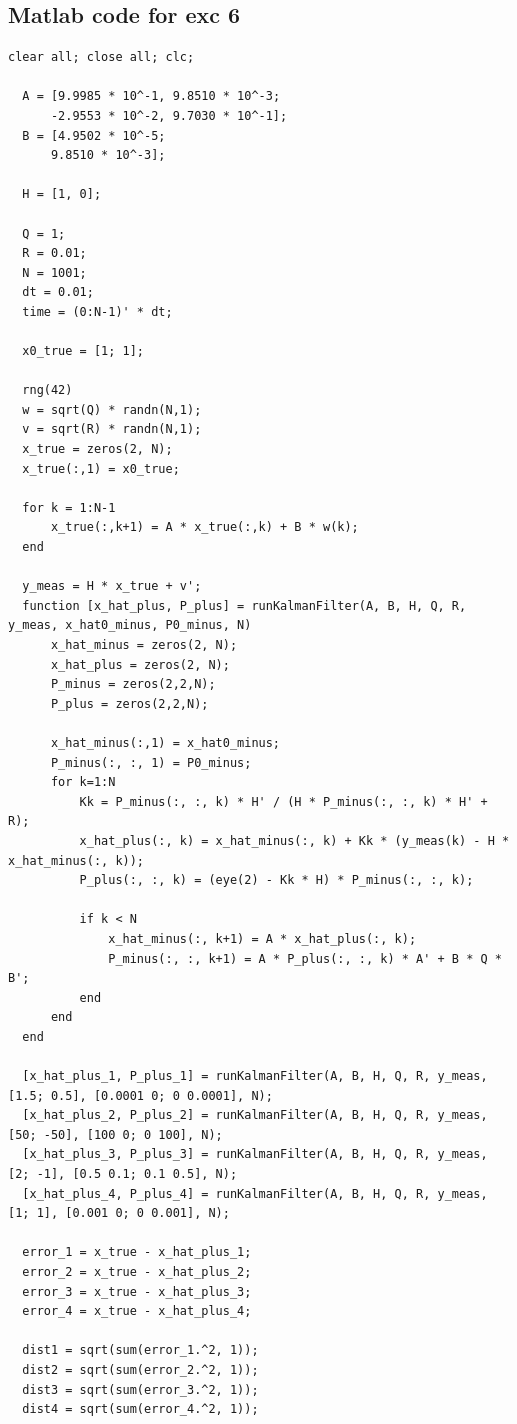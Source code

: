 \documentclass[12pt,A4, onecolumn]{exam}
\begin{document}
\begin{questions}
\subsection{Matlab code for exc 6}

\begin{lstlisting}[style=matlabstyle]
 clear all; close all; clc;

  A = [9.9985 * 10^-1, 9.8510 * 10^-3;
      -2.9553 * 10^-2, 9.7030 * 10^-1];
  B = [4.9502 * 10^-5;
      9.8510 * 10^-3];

  H = [1, 0];

  Q = 1;
  R = 0.01;
  N = 1001;
  dt = 0.01;
  time = (0:N-1)' * dt;

  x0_true = [1; 1];

  rng(42)
  w = sqrt(Q) * randn(N,1);
  v = sqrt(R) * randn(N,1);
  x_true = zeros(2, N);
  x_true(:,1) = x0_true;

  for k = 1:N-1
      x_true(:,k+1) = A * x_true(:,k) + B * w(k);
  end

  y_meas = H * x_true + v';
  function [x_hat_plus, P_plus] = runKalmanFilter(A, B, H, Q, R, y_meas, x_hat0_minus, P0_minus, N)
      x_hat_minus = zeros(2, N);
      x_hat_plus = zeros(2, N);
      P_minus = zeros(2,2,N);
      P_plus = zeros(2,2,N);

      x_hat_minus(:,1) = x_hat0_minus;
      P_minus(:, :, 1) = P0_minus;
      for k=1:N
          Kk = P_minus(:, :, k) * H' / (H * P_minus(:, :, k) * H' + R);
          x_hat_plus(:, k) = x_hat_minus(:, k) + Kk * (y_meas(k) - H * x_hat_minus(:, k));
          P_plus(:, :, k) = (eye(2) - Kk * H) * P_minus(:, :, k);

          if k < N
              x_hat_minus(:, k+1) = A * x_hat_plus(:, k);
              P_minus(:, :, k+1) = A * P_plus(:, :, k) * A' + B * Q * B';
          end
      end
  end

  [x_hat_plus_1, P_plus_1] = runKalmanFilter(A, B, H, Q, R, y_meas, [1.5; 0.5], [0.0001 0; 0 0.0001], N);
  [x_hat_plus_2, P_plus_2] = runKalmanFilter(A, B, H, Q, R, y_meas, [50; -50], [100 0; 0 100], N);
  [x_hat_plus_3, P_plus_3] = runKalmanFilter(A, B, H, Q, R, y_meas, [2; -1], [0.5 0.1; 0.1 0.5], N);
  [x_hat_plus_4, P_plus_4] = runKalmanFilter(A, B, H, Q, R, y_meas, [1; 1], [0.001 0; 0 0.001], N);

  error_1 = x_true - x_hat_plus_1;
  error_2 = x_true - x_hat_plus_2;
  error_3 = x_true - x_hat_plus_3;
  error_4 = x_true - x_hat_plus_4;

  dist1 = sqrt(sum(error_1.^2, 1));
  dist2 = sqrt(sum(error_2.^2, 1));
  dist3 = sqrt(sum(error_3.^2, 1));
  dist4 = sqrt(sum(error_4.^2, 1));


\end{lstlisting}
\end{questions}
\end{document}
